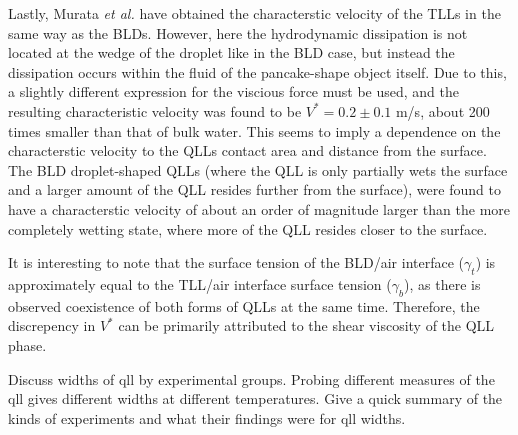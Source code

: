 Lastly, Murata \textit{et al.} have obtained the characterstic
velocity of the TLLs in the same way as the BLDs. However, here the
hydrodynamic dissipation is not located at the wedge of the droplet
like in the BLD case, but instead the dissipation occurs within the
fluid of the pancake-shape object itself. Due to this, a slightly
different expression for the viscious force must be used, and the
resulting characteristic velocity was found to be $V^* = 0.2 \pm 0.1$
m/s, about 200 times smaller than that of bulk water. This seems to
imply a dependence on the characterstic velocity to the QLLs contact
area and distance from the surface. The BLD droplet-shaped QLLs (where
the QLL is only partially wets the surface and a larger amount of the
QLL resides further from the surface), were found to have a
characterstic velocity of about an order of magnitude larger than the
more completely wetting state, where more of the QLL resides closer to
the surface.

It is interesting to note that the surface tension of the BLD/air
interface ($\gamma_t$) is approximately equal to the TLL/air interface
surface tension ($\gamma_b$), as there is observed coexistence of both
forms of QLLs at the same time. Therefore, the discrepency in $V^*$
can be primarily attributed to the shear viscosity of the QLL phase.
 


Discuss widths of qll by experimental groups. Probing different
measures of the qll gives different widths at different
temperatures. Give a quick summary of the kinds of experiments and
what their findings were for qll widths.




